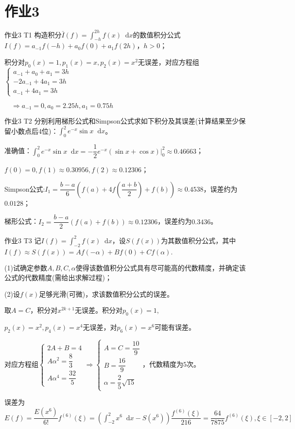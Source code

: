 \documentclass{beamer}
\newcommand*{\diff}{\mathop{}\!\mathrm{d}}
\begin{document}
\section{作业3}
    \begin{frame}{作业3 T1}
        构造积分$\bar{I}(f)=\int_{-h}^{2h}f(x)\diff x$的数值积分公式$I(f)=a_{-1}f(-h)+a_0 f(0)+a_1 f(2h)$，$h>0$；\vspace{1cm}

        \pause 积分对$p_0(x)=1,p_1(x)=x,p_2(x)=x^2$无误差，对应方程组$\begin{cases}a_{-1}+a_0+a_1=3h\\-2a_{-1}+4a_1=3h\\a_{-1}+4a_1=3h\end{cases}$

        \pause $\quad\Rightarrow a_{-1}=0,a_0=2.25h,a_1=0.75h$
    \end{frame}
    \begin{frame}{作业3 T2}
        分别利用梯形公式和Simpson公式求如下积分及其误差(计算结果至少保留小数点后4位)：$\int_0^2 e^{-x}\sin x\diff x$。\vspace{1cm}

        \pause 准确值：$\int_0^2 e^{-x}\sin x\diff x=-\dfrac12 e^{-x}(\sin x+\cos x)\Big|_0^2\approx 0.46663$；

        \pause $ f(0)=0,f(1)\approx0.30956,f(2)\approx0.12306$；

        \pause Simpson公式:$I_1=\dfrac{b-a}6\left(f(a)+4f\left(\dfrac{a+b}2\right)+f(b)\right)\approx0.4538$，误差约为$0.0128$；

        \pause 梯形公式：$I_2=\dfrac{b-a}{2}(f(a)+f(b))\approx0.12306$，误差约为$0.3436$。
    \end{frame}
    \begin{frame}{作业3 T3}
        记$I(f)=\int_{-2}^2 f(x)\diff x$，设$S(f(x))$为其数值积分公式，其中$I(f)\approx S(f(x))=Af(-\alpha)+Bf(0)+Cf(\alpha)$.\vspace{0.08cm}

        (1)试确定参数$A,B,C,\alpha$使得该数值积分公式具有尽可能高的代数精度，并确定该公式的代数精度(需给出求解过程)；

        (2)设$f(x)$足够光滑(可微)，求该数值积分公式的误差。

        \pause 取$A=C$，积分对$x^{2k+1}$无误差。积分对$p_0(x)=1$,

        \pause $p_2(x)=x^2,p_4(x)=x^4$无误差，对$p_6(x)=x^6$可能有误差。

        \pause 对应方程组$\begin{cases}2A+B=4\\A\alpha^2=\dfrac83\\A\alpha^4=\dfrac{32}5\end{cases}\Longrightarrow\begin{cases}A=C=\dfrac{10}9\\B=\dfrac{16}9\\\alpha=\dfrac25\sqrt{15}\end{cases}$，代数精度为$5$次。

        \pause 误差为$E(f)=\dfrac{E(x^6)}{6!}f^{(6)}(\xi)=\left(\int_{-2}^2 x^6\diff x-S(x^6)\right)\dfrac{f^{(6)}(\xi)}{216}=\dfrac{64}{7875} f^{(6)}(\xi),\xi\in[-2,2]$
    \end{frame}
\end{document}
